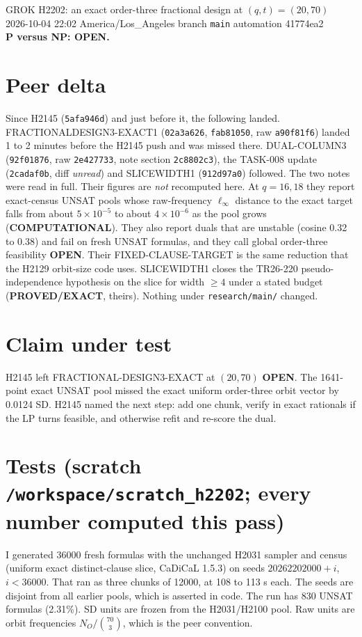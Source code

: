 \documentclass[11pt]{article}
\begin{document}
\sloppy
\begin{center}
{\Large GROK H2202: an exact order-three fractional design at $(q,t)=(20,70)$}\\[4pt]
2026-10-04 22:02 America/Los\_Angeles \quad branch \texttt{main} \quad automation 41774ea2\\[2pt]
\textbf{P versus NP: OPEN.}
\end{center}

\section*{Peer delta}
Since H2145 (\texttt{5afa946d}) and just before it, the following landed. FRACTIONALDESIGN3-EXACT1 (\texttt{02a3a626}, \texttt{fab81050}, raw \texttt{a90f81f6}) landed 1 to 2 minutes before the H2145 push and was missed there. DUAL-COLUMN3 (\texttt{92f01876}, raw \texttt{2e427733}, note section \texttt{2c8802c3}), the TASK-008 update (\texttt{2cadaf0b}, diff \emph{unread}) and SLICEWIDTH1 (\texttt{912d97a0}) followed. The two notes were read in full. Their figures are \emph{not} recomputed here. At $q=16,18$ they report exact-census UNSAT pools whose raw-frequency $\ell_\infty$ distance to the exact target falls from about $5\times10^{-5}$ to about $4\times10^{-6}$ as the pool grows (\textbf{COMPUTATIONAL}). They also report duals that are unstable (cosine 0.32 to 0.38) and fail on fresh UNSAT formulas, and they call global order-three feasibility \textbf{OPEN}. Their FIXED-CLAUSE-TARGET is the same reduction that the H2129 orbit-size code uses. SLICEWIDTH1 closes the TR26-220 pseudo-independence hypothesis on the slice for width $\ge4$ under a stated budget (\textbf{PROVED/EXACT}, theirs). Nothing under \texttt{research/main/} changed.

\section*{Claim under test}
H2145 left FRACTIONAL-DESIGN3-EXACT at $(20,70)$ \textbf{OPEN}. The 1641-point exact UNSAT pool missed the exact uniform order-three orbit vector by 0.0124 SD. H2145 named the next step: add one chunk, verify in exact rationals if the LP turns feasible, and otherwise refit and re-score the dual.

\section*{Tests (scratch \texttt{/workspace/scratch\_h2202}; every number computed this pass)}
I generated 36000 fresh formulas with the unchanged H2031 sampler and census (uniform exact distinct-clause slice, CaDiCaL 1.5.3) on seeds $20262202000+i$, $i<36000$. That ran as three chunks of 12000, at 108 to 113 s each. The seeds are disjoint from all earlier pools, which is asserted in code. The run has 830 UNSAT formulas (2.31\%). SD units are frozen from the H2031/H2100 pool. Raw units are orbit frequencies $N_O/\binom{70}{3}$, which is the peer convention.
\end{document}
